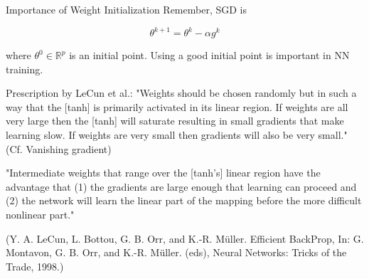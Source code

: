 \begin{frame}[allowframebreaks]

\begin{myconceptblock}{6.30}{Importance of Weight Initialization}
    Remember, SGD is

    $$
    \theta^{k+1}=\theta^{k}-\alpha g^{k}
    $$

    where $\theta^{0} \in \mathbb{R}^{p}$ is an initial point. Using a good initial point is important in NN training.

    Prescription by LeCun et al.: "Weights should be chosen randomly but in such a way that the [tanh] is primarily activated in its linear region. If weights are all very large then the [tanh] will saturate resulting in small gradients that make learning slow. If weights are very small then gradients will also be very small." (Cf. Vanishing gradient)

    "Intermediate weights that range over the [tanh's] linear region have the advantage that (1) the gradients are large enough that learning can proceed and (2) the network will learn the linear part of the mapping before the more difficult nonlinear part."

    (Y. A. LeCun, L. Bottou, G. B. Orr, and K.-R. Müller. Efficient BackProp, In: G. Montavon, G. B. Orr, and K.-R. Müller. (eds), Neural Networks: Tricks of the Trade, 1998.)
\end{myconceptblock}

\end{frame}

